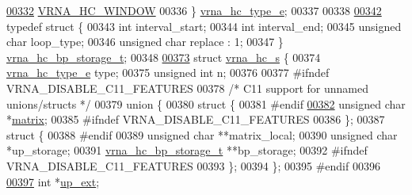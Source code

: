 \begin{DoxyCode}
\hyperlink{constraints__hard_8h_a0fcb8bda9b3712e14f8f513def112435a876c110b3de8e8c89ba5824b08cadb74}{00332}   \hyperlink{constraints__hard_8h_a0fcb8bda9b3712e14f8f513def112435a876c110b3de8e8c89ba5824b08cadb74}{VRNA\_HC\_WINDOW}    
00336 \} \hyperlink{constraints__hard_8h_a0fcb8bda9b3712e14f8f513def112435}{vrna\_hc\_type\_e};
00337 
00338 
\hyperlink{structvrna__hc__bp__storage__t}{00342} \textcolor{keyword}{typedef} \textcolor{keyword}{struct }\{
00343   \textcolor{keywordtype}{int}           interval\_start;
00344   \textcolor{keywordtype}{int}           interval\_end;
00345   \textcolor{keywordtype}{unsigned} \textcolor{keywordtype}{char} loop\_type;
00346   \textcolor{keywordtype}{unsigned} \textcolor{keywordtype}{char} replace : 1;
00347 \} \hyperlink{structvrna__hc__bp__storage__t}{vrna\_hc\_bp\_storage\_t};
00348 
\hyperlink{group__hard__constraints}{00373} \textcolor{keyword}{struct }\hyperlink{group__hard__constraints_structvrna__hc__s}{vrna\_hc\_s} \{
00374   \hyperlink{constraints__hard_8h_a0fcb8bda9b3712e14f8f513def112435}{vrna\_hc\_type\_e}  type;
00375   \textcolor{keywordtype}{unsigned} \textcolor{keywordtype}{int}    n;
00376 
00377 \textcolor{preprocessor}{#ifndef VRNA\_DISABLE\_C11\_FEATURES}
00378   \textcolor{comment}{/* C11 support for unnamed unions/structs */}
00379   \textcolor{keyword}{union }\{
00380     \textcolor{keyword}{struct }\{
00381 \textcolor{preprocessor}{#endif}
\hyperlink{group__hard__constraints_a6ff99f530ca7ca9719e164321d051bde}{00382}       \textcolor{keywordtype}{unsigned} \textcolor{keywordtype}{char} *\hyperlink{group__hard__constraints_a6ff99f530ca7ca9719e164321d051bde}{matrix};     
00385 \textcolor{preprocessor}{#ifndef VRNA\_DISABLE\_C11\_FEATURES}
00386     \};
00387     \textcolor{keyword}{struct }\{
00388 \textcolor{preprocessor}{#endif}
00389       \textcolor{keywordtype}{unsigned} \textcolor{keywordtype}{char}         **matrix\_local;
00390       \textcolor{keywordtype}{unsigned} \textcolor{keywordtype}{char}         *up\_storage;
00391       \hyperlink{structvrna__hc__bp__storage__t}{vrna\_hc\_bp\_storage\_t}  **bp\_storage;
00392 \textcolor{preprocessor}{#ifndef VRNA\_DISABLE\_C11\_FEATURES}
00393     \};
00394   \};
00395 \textcolor{preprocessor}{#endif}
00396 
\hyperlink{group__hard__constraints_a60094038af04093b2fee9b883266ff75}{00397}   \textcolor{keywordtype}{int}                         *\hyperlink{group__hard__constraints_a60094038af04093b2fee9b883266ff75}{up\_ext};    

\end{DoxyCode}
